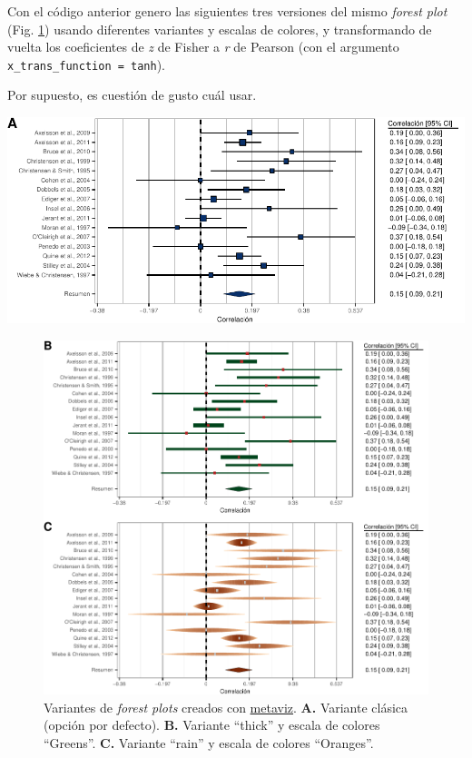 \documentclass[
  bookmarksnumbered]{article}
\begin{document}
Con el código anterior genero las siguientes tres versiones del mismo \emph{forest plot} (Fig. \ref{fig:for-plot3b}) usando diferentes variantes y escalas de colores, y transformando de vuelta los coeficientes de \emph{z} de Fisher a \emph{r} de Pearson (con el argumento \texttt{x\_trans\_function\ =\ tanh}).

Por supuesto, es cuestión de gusto cuál usar.

\includegraphics{Meta-analysis_files/figure-latex/for-plot3-1.pdf}

\begin{figure}
\centering
\includegraphics{Meta-analysis_files/figure-latex/for-plot3b-1.pdf}
\caption{\label{fig:for-plot3b}Variantes de \emph{forest plots} creados con \href{https://cran.r-project.org/web/packages/metaviz/vignettes/metaviz.html}{metaviz}. \textbf{A.} Variante clásica (opción por defecto). \textbf{B.} Variante ``thick'' y escala de colores ``Greens''. \textbf{C.} Variante ``rain'' y escala de colores ``Oranges''.}
\end{figure}
\end{document}
